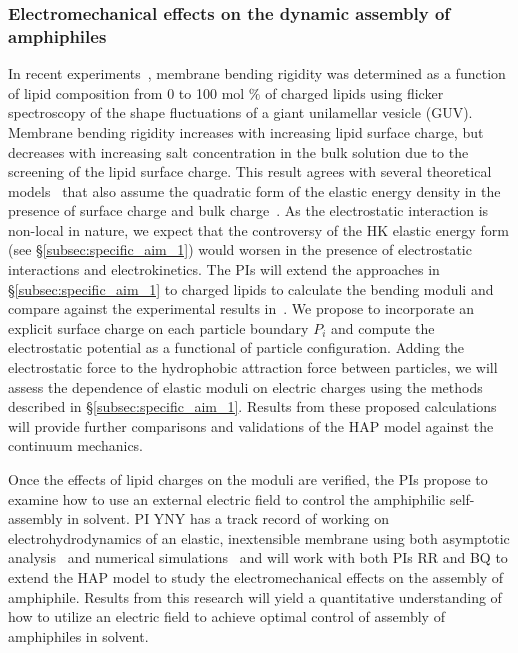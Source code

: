 \subsubsection{Electromechanical effects on the dynamic assembly of amphiphiles \label{subsubsec:em_effects}}
In recent experiments~\cite{FaizEtAl2019_SoftMatt}, membrane bending
rigidity was determined as a function of lipid composition from 0 to 100
mol $\%$ of charged lipids using flicker spectroscopy of the shape
fluctuations of a giant unilamellar vesicle (GUV).
Membrane bending rigidity increases with increasing lipid surface
charge, but decreases with increasing salt concentration in the bulk
solution due to the screening of the lipid surface charge. This
result agrees
with several theoretical models~\cite{Kralchevsky1996_JCIS,
May1996_JChemPhys, LoubetEtAl2013_PRE} that also assume the quadratic
form of the elastic energy density in the presence of surface charge and
bulk charge~\cite{DuplantierGoldstein1990_PRL, Winterhalter1992_JPC}. As
the electrostatic interaction is non-local in nature, we expect that the
controversy of the HK elastic energy form (see
\S\ref{subsec:specific_aim_1}) would worsen in the presence of
electrostatic interactions and electrokinetics. The PIs will extend the
approaches in \S\ref{subsec:specific_aim_1} to charged lipids to
calculate the bending moduli and compare against the experimental
results in~\cite{FaizEtAl2019_SoftMatt}. We propose to incorporate an
explicit surface charge on each particle boundary $P_i$ and compute the
electrostatic potential as a functional of particle configuration.
Adding the electrostatic force to the hydrophobic attraction force
between particles, we will assess the dependence of elastic moduli on
electric charges using the methods described in
\S\ref{subsec:specific_aim_1}. Results from these proposed calculations
will provide further comparisons and validations of the HAP model
against the continuum mechanics.

Once the effects of lipid charges on the moduli are verified, the PIs
propose to examine how to use an external electric field to control the
amphiphilic self-assembly in solvent. PI YNY has a track record of
working on electrohydrodynamics of an elastic, inextensible membrane
using both asymptotic analysis~\cite{Nganguia2013_PRE, Young2014_JFM,
Young2015_PoF} and numerical simulations~\cite{Nganguia2015_CiCP} and
will work with both PIs RR and BQ to extend the HAP model to study the
electromechanical effects on the assembly of amphiphile. Results from
this research will yield a quantitative understanding of how to utilize
an electric field to achieve optimal control of assembly of amphiphiles
in solvent.




